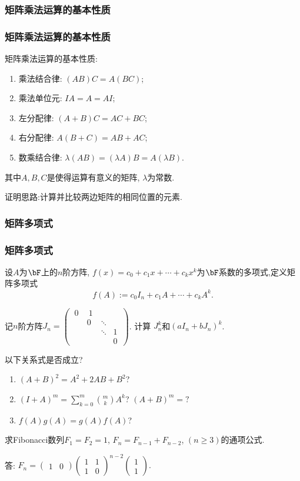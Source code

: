 \subsubsection{矩阵乘法运算的基本性质}
\begin{frame}\frametitle{矩阵乘法运算的基本性质}
\begin{theorem}矩阵乘法运算的基本性质:
\begin{enumerate}
\item 乘法结合律: $(AB)C=A(BC)$; \pp
\item 乘法单位元: $IA=A=AI$; \pp
\item 左分配律: $(A+B)C=AC+BC$; \pp
\item 右分配律: $A(B+C)=AB+AC$; \pp
\item 数乘结合律: $\lambda(AB) = (\lambda A)B=A(\lambda B)$.
\end{enumerate}
\pp
其中$A,B,C$是使得运算有意义的矩阵, $\lambda$为常数.
\end{theorem}
证明思路:计算并比较两边矩阵的相同位置的元素.
\pp
\bigskip

\end{frame}





\subsubsection{矩阵多项式}
\begin{frame}\frametitle{矩阵多项式}
设$A$为$\bF$上的$n$阶方阵, $f(x)=c_0+c_1x+\cdots+c_kx^k$为$\bF$系数的多项式,定义矩阵多项式
\[f(A):=c_0I_n + c_1A+\cdots+c_kA^k.\]
\pp
\begin{example}
记$n$阶方阵$J_n=\begin{pmatrix}\ 0\ &\ 1\ &\ \ \ &\ \ \ \\&0&\ddots&\\&&\ddots&1\\&&&0\end{pmatrix}$. 计算 $J_n^k$和$(aI_n+bJ_n)^k$.
\end{example}
\pp
以下关系式是否成立?
\begin{enumerate}
\item $(A+B)^2=A^2+2AB+B^2$? \pp
\item $(I+A)^m=\sum_{k=0}^{m}{m\choose k}A^k$? $(A+B)^m=?$ \pp
\item $f(A)g(A)=g(A)f(A)$?
\end{enumerate}
\pp
\begin{example}
求Fibonacci数列$F_1=F_2=1$, $F_n=F_{n-1}+F_{n-2}$, $(n\geq3)$的通项公式.
\end{example}
\pp
答: $F_n=\begin{pmatrix}1&0\end{pmatrix}
\begin{pmatrix}1&1\\1&0\end{pmatrix}^{n-2}
\begin{pmatrix}1\\1\end{pmatrix}.$
\end{frame}





